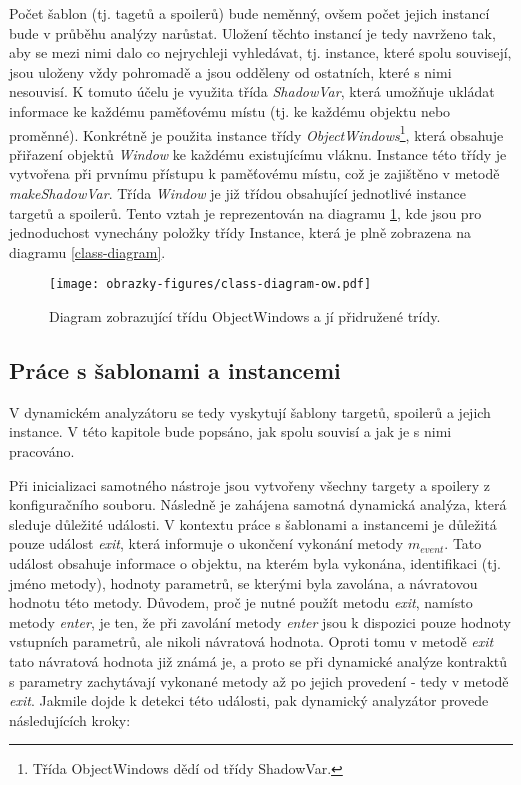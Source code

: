 Počet šablon (tj. tagetů a spoilerů) bude neměnný, ovšem počet jejich instancí bude v průběhu analýzy narůstat. Uložení těchto instancí je tedy navrženo tak, aby se mezi nimi dalo co nejrychleji vyhledávat, tj. instance, které spolu souvisejí, jsou uloženy vždy pohromadě a jsou odděleny od ostatních, které s nimi nesouvisí. K tomuto účelu je využita třída \textit{ShadowVar}, která umožňuje ukládat informace ke každému paměťovému místu (tj. ke každému objektu nebo proměnné). Konkrétně je použita instance třídy \textit{ObjectWindows}\footnote{Třída ObjectWindows dědí od třídy ShadowVar.}, která obsahuje přiřazení objektů \textit{Window} ke každému existujícímu vláknu. Instance této třídy je vytvořena při prvnímu přístupu k paměťovému místu, což je zajištěno v metodě \textit{makeShadowVar}.  Třída \textit{Window} je již třídou obsahující jednotlivé instance targetů a spoilerů. Tento vztah je reprezentován na diagramu \ref{class-object-windows}, kde jsou pro jednoduchost vynechány položky třídy Instance, která je plně zobrazena na diagramu \ref{class-diagram}.

\begin{figure}[!htbp]
    \texttt{[image: obrazky-figures/class-diagram-ow.pdf]}
    \caption{Diagram zobrazující třídu ObjectWindows a jí přidružené trídy.}
    \label{class-object-windows}
\end{figure}

\subsection{Práce s šablonami a instancemi}\label{sablony-instance}

V dynamickém analyzátoru se tedy vyskytují šablony targetů, spoilerů a jejich instance. V této kapitole bude popsáno, jak spolu souvisí a jak je s nimi pracováno.

Při inicializaci samotného nástroje jsou vytvořeny všechny targety a spoilery z konfiguračního souboru. Následně je zahájena samotná dynamická analýza, která sleduje důležité události. V kontextu práce s šablonami a instancemi je důležitá pouze událost \textit{exit}, která informuje o ukončení vykonání metody $m_{event}$. Tato událost obsahuje informace o objektu, na kterém byla vykonána, identifikaci (tj. jméno metody), hodnoty parametrů, se kterými byla zavolána, a návratovou hodnotu této metody. Důvodem, proč je nutné použít metodu \textit{exit}, namísto metody \textit{enter}, je ten, že při zavolání metody \textit{enter} jsou k dispozici pouze hodnoty vstupních parametrů, ale nikoli návratová hodnota. Oproti tomu v metodě \textit{exit} tato návratová hodnota již známá je, a proto se při dynamické analýze kontraktů s parametry zachytávají vykonané metody až po jejich provedení - tedy v metodě \textit{exit}. Jakmile dojde k detekci této události, pak dynamický analyzátor provede následujících kroky:

